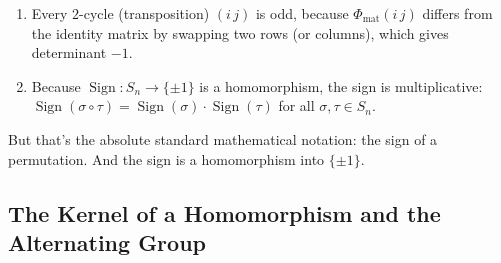 \begin{content}

\begin{steps}
\begin{enumerate}[label=\textbf{\arabic*.}]
    \item Every $2$-cycle (transposition) $(i\,j)$ is odd, because $\Phi_{\text{mat}}(i\,j)$ differs from the identity matrix by swapping two rows (or columns), which gives determinant $-1$.
    \item Because $\operatorname{Sign} \colon S_n \to \{\pm 1\}$ is a homomorphism, the sign is multiplicative: $\operatorname{Sign}(\sigma \circ \tau) = \operatorname{Sign}(\sigma) \cdot \operatorname{Sign}(\tau)$ for all $\sigma, \tau \in S_n$.
\end{enumerate}
\end{steps}
\end{content}

\begin{speech}[00:25:25 - 00:25:43]
But that's the absolute standard mathematical notation: the sign of a permutation. And the sign is a homomorphism into $\{\pm 1\}$.
\end{speech}

\begin{hidden}
\end{hidden}

\subsection{The Kernel of a Homomorphism and the Alternating Group}

